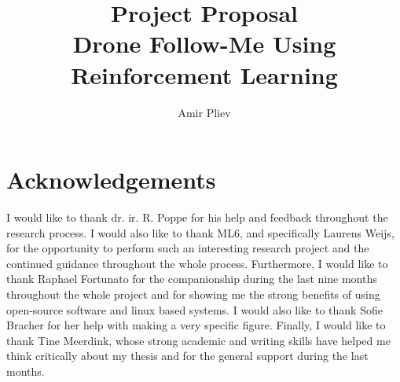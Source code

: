 \documentclass[11pt]{article}
\begin{document}
    
        
    \title{Project Proposal \large \\Drone Follow-Me Using Reinforcement Learning}
    \author{Amir Pliev}


    
    
    

    \thispagestyle{empty}
    \listoffigures
    \thispagestyle{empty}
    \listoftables
    \newpage
    
    \thispagestyle{empty}
    \tableofcontents
    \thispagestyle{empty}
    \newpage
    \restoregeometry
    
    {


        
        
        

        

        

        

        
        
        

        \newpage
    }
    
    

    

    \section{Acknowledgements}
    I would like to thank dr. ir. R. Poppe for his help and feedback throughout the 
    research process. I would also like to thank ML6, and specifically Laurens Weijs, 
    for the opportunity to perform such an interesting research project and the 
    continued guidance throughout the whole process. Furthermore, I would like to 
    thank Raphael Fortunato for the companionship during the last nine months throughout the 
    whole project and for showing me the strong benefits of using open-source software
    and linux based systems. 
    I would also like to thank Sofie Bracher for her help with making a very specific
    figure. Finally, I would like to thank Tine Meerdink, whose strong academic and 
    writing skills have helped me think critically about my thesis and for the general 
    support during the last months. 
\end{document}
